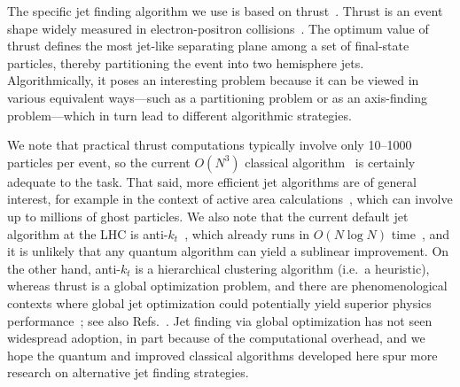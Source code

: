 \documentclass[aps,prd,twocolumn,superscriptaddress,preprintnumbers,nofootinbib,longbibliography,floatfix]{revtex4-1}
\DeclareRobustCommand{\Refs}[1]{Refs.~\cite{#1}}
\begin{document}
The specific jet finding algorithm we use is based on thrust~\cite{Brandt:1964sa,Farhi:1977sg,DeRujula:1978vmq}.
%
Thrust is an event shape widely measured in electron-positron collisions~\cite{Barber:1979bj,Bartel:1979ut,Althoff:1983ew,Bender:1984fp,Abrams:1989ez,Li:1989sn,Decamp:1990nf,Braunschweig:1990yd,Abe:1994mf,Heister:2003aj,Abdallah:2003xz,Achard:2004sv,Abbiendi:2004qz}.
%
The optimum value of thrust defines the most jet-like separating plane among a set of final-state particles, thereby partitioning the event into two hemisphere jets.
%
Algorithmically, it poses an interesting problem because it can be viewed in various equivalent ways---such as a partitioning problem or as an axis-finding problem---which in turn lead to different algorithmic strategies.


We note that practical thrust computations typically involve only 10--1000 particles per event, so the current $O(N^3)$ classical algorithm~\cite{Yamamoto:1984fd} is certainly adequate to the task.
%
That said, more efficient jet algorithms are of general interest, for example in the context of active area calculations~\cite{Cacciari:2008gn}, which can involve up to millions of ghost particles.
%
We also note that the current default jet algorithm at the \ac{LHC} is anti-$k_t$~\cite{Cacciari:2008gp}, which already runs in $O(N\log N)$ time~\cite{Cacciari:2005hq,Cacciari:2011ma}, and it is unlikely that any quantum algorithm can yield a sublinear improvement.
%
On the other hand, anti-$k_t$ is a hierarchical clustering algorithm (i.e.~a heuristic), whereas thrust is a global optimization problem, and there are phenomenological contexts where global jet optimization could potentially yield superior physics performance~\cite{Stewart:2015waa,Thaler:2015xaa}; see also \Refs{Ellis:2001aa,Berger:2002jt,Angelini:2002et,Angelini:2004ac,Grigoriev:2003yc,Grigoriev:2003tn,Chekanov:2005cq,Lai:2008zp,Volobouev:2009rv,Georgi:2014zwa,Ge:2014ova,Bai:2014qca,Mackey:2015hwa,Bai:2015fka}.
%
Jet finding via global optimization has not seen widespread adoption, in part because of the computational overhead, and we hope the quantum and improved classical algorithms developed here spur more research on alternative jet finding strategies.   
\end{document}
